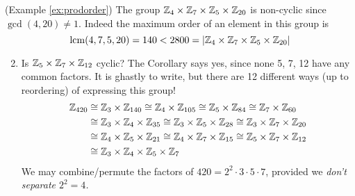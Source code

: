 \begin{examples}{}{}
\exstart (Example \ref{ex:prodorder}) The group $\mathbb{Z}_4\times\mathbb{Z}_7\times\mathbb{Z}_5\times\mathbb{Z}_{20}$ is non-cyclic since $\gcd(4,20)\neq 1$. Indeed the maximum order of an element in this group is
\[\operatorname{lcm}(4,7,5,20)=140<2800=\left| \mathbb{Z}_4\times\mathbb{Z}_7\times\mathbb{Z}_5\times\mathbb{Z}_{20}\right|\]
\begin{enumerate}\setcounter{enumi}{1}
  \item Is $\mathbb{Z}_5\times\mathbb{Z}_7\times\mathbb{Z}_{12}$ cyclic? The Corollary says yes, since none 5, 7, 12 have any common factors. It is ghastly to write, but there are 12 different ways (up to reordering) of expressing this group!
\begin{align*}
\mathbb{Z}_{420}&\cong\mathbb{Z}_3\times\mathbb{Z}_{140} \cong\mathbb{Z}_4\times\mathbb{Z}_{105} \cong\mathbb{Z}_5\times\mathbb{Z}_{84} \cong\mathbb{Z}_{7}\times\mathbb{Z}_{60}\\
&\cong\mathbb{Z}_3\times\mathbb{Z}_4\times\mathbb{Z}_{35} \cong\mathbb{Z}_3\times\mathbb{Z}_5\times\mathbb{Z}_{28} \cong\mathbb{Z}_3\times\mathbb{Z}_7\times\mathbb{Z}_{20}\\
&\cong\mathbb{Z}_4\times\mathbb{Z}_5\times\mathbb{Z}_{21} \cong\mathbb{Z}_4\times\mathbb{Z}_7\times\mathbb{Z}_{15} \cong\mathbb{Z}_5\times\mathbb{Z}_7\times\mathbb{Z}_{12}\\
&\cong\mathbb{Z}_3\times\mathbb{Z}_4\times\mathbb{Z}_5\times\mathbb{Z}_7
\end{align*}
We may combine/permute the factors of $420=2^2\cdot 3\cdot 5\cdot 7$, provided we \emph{don't separate $2^2=4$.}
  
\end{enumerate}
\end{examples}



